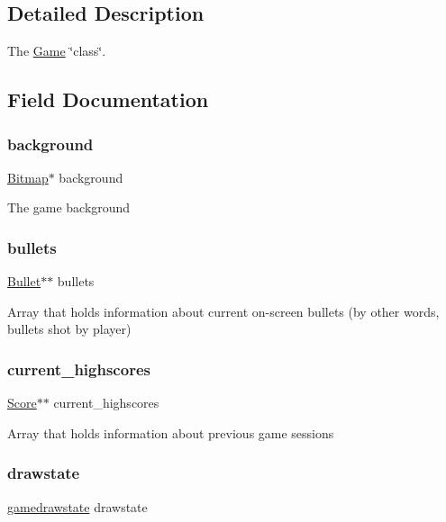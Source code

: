 \subsection{Detailed Description}
The \hyperlink{struct_game}{Game} \char`\"{}class\char`\"{}. 

\subsection{Field Documentation}
\hypertarget{struct_game_a15de70574bc710486bf129a5c8f1634e}{}\label{struct_game_a15de70574bc710486bf129a5c8f1634e} 
\subsubsection{\texorpdfstring{background}{background}}
{\footnotesize\ttfamily \hyperlink{struct_bitmap}{Bitmap}$\ast$ background}

The game background \hypertarget{struct_game_a6a95913dbac873584311bd479b43f911}{}\label{struct_game_a6a95913dbac873584311bd479b43f911} 
\subsubsection{\texorpdfstring{bullets}{bullets}}
{\footnotesize\ttfamily \hyperlink{struct_bullet}{Bullet}$\ast$$\ast$ bullets}

Array that holds information about current on-\/screen bullets (by other words, bullets shot by player) \hypertarget{struct_game_a544b8de55d5dc1667fad656b245d4a5a}{}\label{struct_game_a544b8de55d5dc1667fad656b245d4a5a} 
\subsubsection{\texorpdfstring{current\+\_\+highscores}{current\_highscores}}
{\footnotesize\ttfamily \hyperlink{struct_score}{Score}$\ast$$\ast$ current\+\_\+highscores}

Array that holds information about previous game sessions \hypertarget{struct_game_ab151fa4f58b0ddc30af7e501f6ba2ec3}{}\label{struct_game_ab151fa4f58b0ddc30af7e501f6ba2ec3} 
\subsubsection{\texorpdfstring{drawstate}{drawstate}}
{\footnotesize\ttfamily \hyperlink{group__game_gab1e4078b5fa77cbf79de5e160f4cb261}{gamedrawstate} drawstate}


